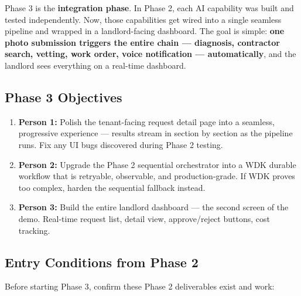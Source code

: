 \documentclass[11pt, a4paper]{article}
\begin{document}
Phase 3 is the \textbf{integration phase}. In Phase 2, each AI capability was built and tested independently. Now, those capabilities get wired into a single seamless pipeline and wrapped in a landlord-facing dashboard. The goal is simple: \textbf{one photo submission triggers the entire chain --- diagnosis, contractor search, vetting, work order, voice notification --- automatically}, and the landlord sees everything on a real-time dashboard.

\subsection{Phase 3 Objectives}

\begin{enumerate}[leftmargin=2em, itemsep=3pt]
  \item \textbf{Person 1:} Polish the tenant-facing request detail page into a seamless, progressive experience --- results stream in section by section as the pipeline runs. Fix any UI bugs discovered during Phase 2 testing.
  \item \textbf{Person 2:} Upgrade the Phase 2 sequential orchestrator into a WDK durable workflow that is retryable, observable, and production-grade. If WDK proves too complex, harden the sequential fallback instead.
  \item \textbf{Person 3:} Build the entire landlord dashboard --- the second screen of the demo. Real-time request list, detail view, approve/reject buttons, cost tracking.
\end{enumerate}

\subsection{Entry Conditions from Phase 2}

Before starting Phase 3, confirm these Phase 2 deliverables exist and work:
\end{document}
